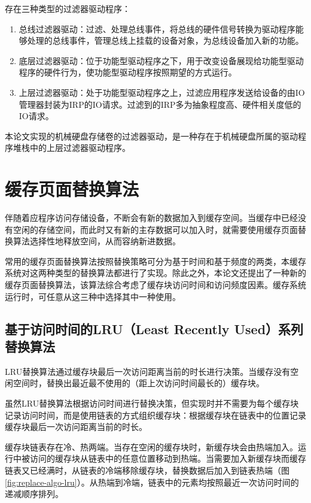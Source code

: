 存在三种类型的过滤器驱动程序：

\begin{enumerate}
\item
总线过滤器驱动：过滤、处理总线事件，将总线的硬件信号转换为驱动程序能够处理的总线事件，管理总线上挂载的设备对象，为总线设备加入新的功能。
\item
底层过滤器驱动：位于功能型驱动程序之下，用于改变设备展现给功能型驱动程序的硬件行为，使功能型驱动程序按照期望的方式运行。
\item
上层过滤器驱动：处于功能型驱动程序之上，过滤应用程序发送给设备的由IO管理器封装为IRP的IO请求。过滤到的IRP多为抽象程度高、硬件相关度低的IO请求。
\end{enumerate}

本论文实现的机械硬盘存储卷的过滤器驱动，是一种存在于机械硬盘所属的驱动程序堆栈中的上层过滤器驱动程序。

\section{缓存页面替换算法}
\label{sec:cache_algorithm}

伴随着应程序访问存储设备，不断会有新的数据加入到缓存空间。当缓存中已经没有空闲的存储空间，而此时又有新的主存数据可以加入时，就需要使用缓存页面替换算法选择性地释放空间，从而容纳新进数据。

常用的缓存页面替换算法按照替换策略可分为基于时间和基于频度的两类，本缓存系统对这两种类型的替换算法都进行了实现。除此之外，本论文还提出了一种新的缓存页面替换算法，该算法综合考虑了缓存块访问时间和访问频度因素。缓存系统运行时，可任意从这三种中选择其中一种使用。

\subsection{基于访问时间的LRU（Least Recently Used）系列替换算法}

LRU替换算法\cite{LRU}通过缓存块最后一次访问距离当前的时长进行决策。当缓存没有空闲空间时，替换出最近最不使用的（距上次访问时间最长的）缓存块。

虽然LRU替换算法根据访问时间进行替换决策，但实现时并不需要为每个缓存块记录访问时间，而是使用链表的方式组织缓存块：根据缓存块在链表中的位置记录缓存块最后一次访问距离当前的时长。

缓存块链表存在冷、热两端。当存在空闲的缓存块时，新缓存块会由热端加入。运行中被访问的缓存块从链表中的任意位置移动到热端。当需要加入新缓存块而缓存链表又已经满时，从链表的冷端移除缓存块，替换数据后加入到链表热端（图\ref{fig:replace-algo-lru}）。从热端到冷端，链表中的元素均按照最近一次访问时间的递减顺序排列。

